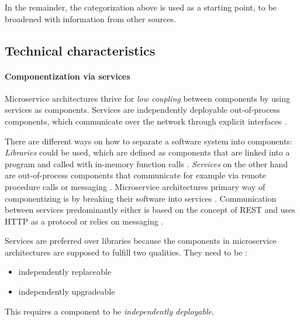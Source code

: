 In the remainder, the categorization above is used as a starting point, to be broadened with information from other sources.

\subsection{Technical characteristics}
\label{bac:TechnicalCharacteristics}

\paragraph{Componentization via services}
\label{bac:ComponentizationViaServices}
Microservice architectures thrive for \textit{low coupling} \citep[p. 314]{Larman2004} between components by using services as components.
Services are independently deployable out-of-process components, which communicate over the network through explicit interfaces \cite{FowlerComponentization2014} \citep[p. 3]{Wolff2016} \citep[p. 179]{Wolff2016}. 

There are different ways on how to separate a software system into components:
\textit{Libraries} could be used, which are defined as components that are linked into a program and called with in-memory function calls \cite{FowlerComponentization2014}. 
\textit{Services} on the other hand are out-of-process components that communicate for example via remote procedure calls or messaging \cite{FowlerComponentization2014}.
Microservice architectures primary way of componentizing is by breaking their software into services \cite{FowlerComponentization2014}.
Communication between services predominantly either is based on the concept of \ac{REST} and uses \ac{HTTP} as a protocol or relies on messaging \cite{FowlerSmartEndpoints2014}.

Services are preferred over libraries because the components in microservice architectures are supposed to fulfill two qualities.
They need to be \cite{FowlerComponentization2014}:
\begin{itemize}
\item independently replaceable
\item independently upgradeable
\end{itemize}
This requires a component to be \textit{independently deployable}.

